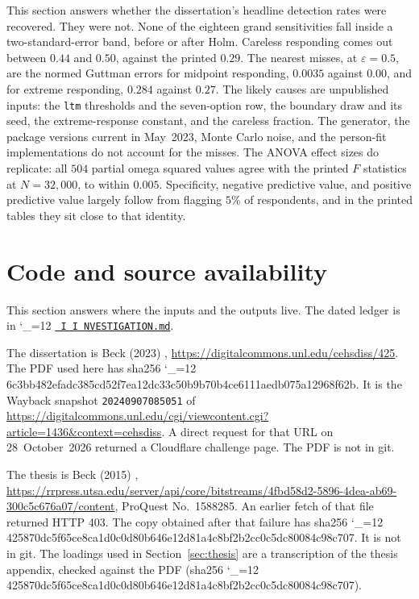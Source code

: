 \documentclass[11pt]{article}
\makeatletter
\newcommand{\sha}{\begingroup\catcode`\_=12 \sha@read}
\newcommand{\sha@read}[1]{\ttfamily\sha@loop#1\relax\endgroup}
\def\sha@loop#1{%
  \ifx\relax#1\else
    #1\allowbreak
    \expandafter\sha@loop
  \fi}
\newcommand{\proofbase}{https://github.com/alectionary/vibe-math/blob/master/formalization/polytomous-person-fit}
\def\pf@show#1{%
  \ifx\relax#1\else
    #1\allowbreak
    \expandafter\pf@show
  \fi}
\newcommand{\src}{\begingroup\catcode`\_=12 \pf@src}
\newcommand{\pf@src}[1]{%
  \edef\srcurl{\proofbase/#1}%
  \href{\srcurl}{\texttt{\pf@show#1\relax}}\endgroup}
\makeatother
\begin{document}
This section answers whether the dissertation's headline detection
rates were recovered.
They were not.
None of the eighteen grand sensitivities fall inside a
two-standard-error band, before or after Holm.
Careless responding comes out between \(0.44\) and \(0.50\), against
the printed \(0.29\).
The nearest misses, at \(\varepsilon=0.5\), are the normed Guttman
errors for midpoint responding, \(0.0035\) against \(0.00\), and for
extreme responding, \(0.284\) against \(0.27\).
The likely causes are unpublished inputs: the \texttt{ltm} thresholds
and the seven-option row, the boundary draw and its seed, the
extreme-response constant, and the careless fraction.
The generator, the package versions current in May~2023, Monte Carlo
noise, and the person-fit implementations do not account for the
misses.
The ANOVA effect sizes do replicate: all \(504\) partial omega squared
values agree with the printed \(F\) statistics at \(N=32{,}000\), to
within \(0.005\).
Specificity, negative predictive value, and positive predictive value
largely follow from flagging \(5\%\) of respondents, and in the printed
tables they sit close to that identity.

\section{Code and source availability}
\label{sec:availability}

This section answers where the inputs and the outputs live.
The dated ledger is in \src{INVESTIGATION.md}.

The dissertation is Beck (2023) \cite{beck2023},
\url{https://digitalcommons.unl.edu/cehsdiss/425}.
The PDF used here has sha256
\sha{86c3bb482efadc385cd52f7ea12dc33c50b9b70b4ce6111aedb075a12968f62b}.
It is the Wayback snapshot \texttt{20240907085051} of
\url{https://digitalcommons.unl.edu/cgi/viewcontent.cgi?article=1436&context=cehsdiss}.
A direct request for that URL on 28~October~2026 returned a Cloudflare
challenge page.
The PDF is not in git.

The thesis is Beck (2015) \cite{beck2015},
\url{https://rrpress.utsa.edu/server/api/core/bitstreams/4fbd58d2-5896-4dea-ab69-300c5c676a07/content},
ProQuest No.~1588285.
An earlier fetch of that file returned HTTP 403.
The copy obtained after that failure has sha256
\sha{0425870dc5f65ce8ca1d0c0d80b646e12d81a4c8bf2b2cc0c5dc80084c98c707}.
It is not in git.
The loadings used in Section~\ref{sec:thesis} are a transcription of the
thesis appendix, checked against the PDF (sha256
\sha{0425870dc5f65ce8ca1d0c0d80b646e12d81a4c8bf2b2cc0c5dc80084c98c707}).
\end{document}
